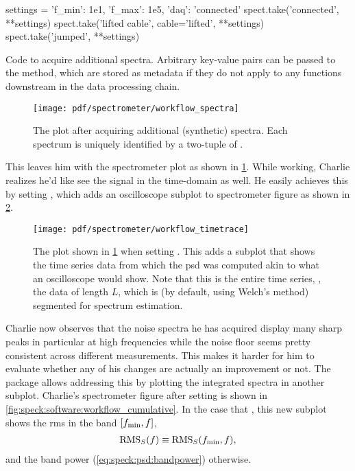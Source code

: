\begin{listing}[htpb]
    \begin{py}
settings = {'f_min': 1e1, 'f_max': 1e5, 'daq': 'connected'}
spect.take('connected', **settings)
spect.take('lifted cable', cable='lifted', **settings)
spect.take('jumped', **settings)
    \end{py}
    \caption[]{
        Code to acquire additional spectra.
        Arbitrary key-value pairs can be passed to the  method, which are stored as metadata if they do not apply to any functions downstream in the data processing chain.
    }
    \label{lst:speck:workflow:spectra}
\end{listing}
\begin{figure}[htpb]
    \centering
    \texttt{[image: pdf/spectrometer/workflow\_spectra]}
    \caption{
        The \pyspeck plot after acquiring additional (synthetic) spectra.
        Each spectrum is uniquely identified by a two-tuple of .
    }
    \label{fig:speck:software:workflow_spectra}
\end{figure}

This leaves him with the spectrometer plot as shown in \cref{fig:speck:software:workflow_spectra}.
While working, Charlie realizes he'd like see the signal in the time-domain as well.
He easily achieves this by setting , which adds an oscilloscope subplot to spectrometer figure as shown in \cref{fig:speck:software:workflow_timetrace}.

\begin{figure}[htpb]
    \centering
    \texttt{[image: pdf/spectrometer/workflow\_timetrace]}
    \caption{
        The \pyspeck plot shown in \cref{fig:speck:software:workflow_spectra} when setting .
        This adds a subplot that shows the time series data from which the \gls{psd} was computed akin to what an oscilloscope would show.
        Note that this is the entire time series, \ie, the data of length $L$, which is (by default, using Welch's method) segmented for spectrum estimation.
    }
    \label{fig:speck:software:workflow_timetrace}
\end{figure}

Charlie now observes that the noise spectra he has acquired display many sharp peaks in particular at high frequencies while the \oneoverf noise floor seems pretty consistent across different measurements.
This makes it harder for him to evaluate whether any of his changes are actually an improvement or not.
The \pyspeck package allows addressing this by plotting the integrated spectra in another subplot.
Charlie's spectrometer figure after setting  is shown in \cref{fig:speck:software:workflow_cumulative}.
In the case that , this new subplot shows the \gls{rms} in the band $[f_{\mathrm{min}}, f]$,
\begin{align}\label{eq:speck:software:cumulative}
    \operatorname{RMS}_S(f)\equiv\operatorname{RMS}_S(f_{\mathrm{min}}, f),
\end{align}
and the band power (\cref{eq:speck:psd:bandpower}) otherwise.

